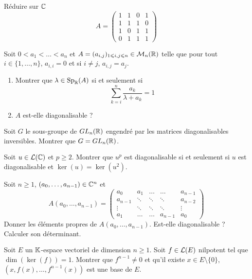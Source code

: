 \begin{exercise}
	Réduire sur $\mathbb{C}$
	$$
	A=
	\begin{pmatrix}
		1 & 1 & 0 & 1\\
		1 & 1 & 1 & 0\\
		1 & 0 & 1 & 1\\
		0 & 1 & 1 & 1
	\end{pmatrix}
	$$
\end{exercise}

\begin{exercise}
	Soit $0<a_{1}<\dots<a_{n}$ et $A=(a_{i,j})_{1\leqslant i,j\leqslant n}\in\mathcal{M}_{n}(\mathbb{R})$ telle que pour tout $i\in\{1,\dots,n\}$, $a_{i,i}=0$ et si $i\neq j$, $a_{i,j}=a_{j}$.
	\begin{enumerate}
		\item Montrer que $\lambda\in\operatorname{Sp}_{\mathbb{R}}(A)$ si et seulement si 
		$$\sum_{k=i}^{n}\frac{a_{k}}{\lambda+a_{k}}=1$$
		\item $A$ est-elle diagonalisable ?
	\end{enumerate}
\end{exercise}

\begin{exercise}
	Soit $G$ le sous-groupe de $GL_{n}(\mathbb{R})$ engendré par les matrices diagonalisables inversibles. Montrer que $G=GL_{n}(\mathbb{R})$.
\end{exercise}

\begin{exercise}
	Soit $u\in\mathcal{L}(\mathbb{C})$ et $p\geqslant2$. Montrer que $u^{p}$ est diagonalisable si et seulement si $u$ est diagonalisable et $\ker(u)=\ker(u^{2})$.
\end{exercise}

\begin{exercise}
	Soit $n\geqslant 1$, $(a_{0},\dots,a_{n-1})\in\mathbb{C}^{n}$ et 
	$$
	A(a_{0},\dots,a_{n-1})=
	\begin{pmatrix}
		a_{0} & a_{1} & \dots & \dots & a_{n-1}\\
		a_{n-1} & \ddots & \ddots & \ddots & a_{n-2}\\
		\vdots & \ddots & \ddots & \ddots & \vdots\\
		a_{1} & \dots & \dots & a_{n-1} & a_{0}
	\end{pmatrix}
	$$
	Donner les éléments propres de $A(a_{0},\dots,a_{n-1})$. Est-elle diagonalisable ? Calculer son déterminant.
\end{exercise}

\begin{exercise}
	Soit $E$ un $\mathbb{K}$-espace vectoriel de dimension $n\geqslant1$. Soit $f\in\mathcal{L}(E)$ nilpotent tel que $\dim(\ker(f))=1$. Montrer que $f^{n-1}\neq 0$ et qu'il existe $x\in E\setminus\{0\}$, $(x,f(x),\dots,f^{n-1}(x))$ est une base de $E$.
\end{exercise}

